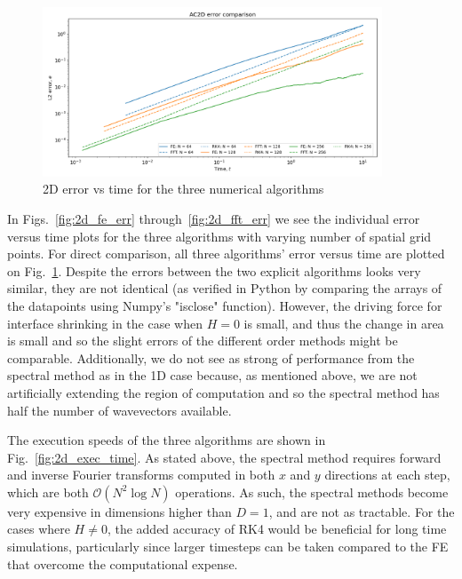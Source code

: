 \documentclass[12pt]{article}
\begin{document}
\begin{figure}
    \centering
    \includegraphics[width=0.9\textwidth]{../figures/AC2D_error_comparison.png}
    \caption{2D error vs time for the three numerical algorithms}
    \label{fig:2d_error_comparison}
\end{figure}

In Figs.~\ref{fig:2d_fe_err} through~\ref{fig:2d_fft_err} we see the individual error versus time plots for the three algorithms with varying number of spatial grid points.
For direct comparison, all three algorithms' error versus time are plotted on Fig.~\ref{fig:2d_error_comparison}.
Despite the errors between the two explicit algorithms looks very similar, they are not identical (as verified in Python by comparing the arrays of the datapoints using Numpy's "isclose" function).
However, the driving force for interface shrinking in the case when $H=0$ is small, and thus the change in area is small and so the slight errors of the different order methods might be comparable.
Additionally, we do not see as strong of performance from the spectral method as in the 1D case because, as mentioned above, we are not artificially extending the region of computation and so the spectral method has half the number of wavevectors available.

The execution speeds of the three algorithms are shown in Fig.~\ref{fig:2d_exec_time}.
As stated above, the spectral method requires forward and inverse Fourier transforms computed in both $x$ and $y$ directions at each step, which are both $\mathcal{O}(N^2 \log N)$ operations.
As such, the spectral methods become very expensive in dimensions higher than $D=1$, and are not as tractable.
For the cases where $H\neq0$, the added accuracy of RK4 would be beneficial for long time simulations, particularly since larger timesteps can be taken compared to the FE that overcome the computational expense.
\end{document}
